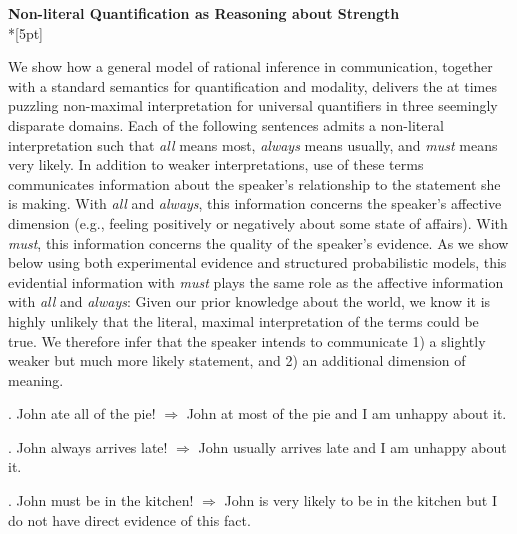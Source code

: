\documentclass[12pt]{article}
\begin{document}
\begin{center}\textbf{Non-literal Quantification as Reasoning about Strength}\\*[5pt]
\end{center}

\vspace{-11pt}


We show how a general model of rational inference in communication, together with a standard semantics for quantification and modality, delivers the at times puzzling non-maximal interpretation for universal quantifiers in three seemingly disparate domains. Each of the following sentences admits a non-literal interpretation such that \emph{all} means most, \emph{always} means usually, and \emph{must} means very likely. In addition to weaker interpretations, use of these terms communicates information about the speaker's relationship to the statement she is making. With \emph{all} and \emph{always}, this information concerns the speaker's affective dimension (e.g., feeling positively or negatively about some state of affairs). With \emph{must}, this information concerns the quality of the speaker's evidence. As we show below using both experimental evidence and structured probabilistic models, this evidential information with \emph{must} plays the same role as the affective information with \emph{all} and \emph{always}: Given our prior knowledge about the world, we know it is highly unlikely that the literal, maximal interpretation of the terms could be true. We therefore infer that the speaker intends to communicate 1) a slightly weaker but much more likely statement, and 2) an additional dimension of meaning. 

\ex. John ate all of the pie! $\Rightarrow$ John at most of the pie and I am unhappy about it.

\ex. John always arrives late! $\Rightarrow$ John usually arrives late and I am unhappy about it.

\ex. John must be in the kitchen! $\Rightarrow$ John is very likely to be in the kitchen but I do not have direct evidence of this fact.

\end{document}
